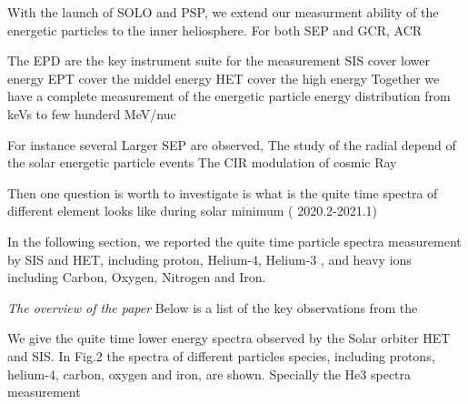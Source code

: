 
With the launch of \ac{SOLO} and \ac{PSP}, we extend our measurment ability of the energetic particles to the inner heliosphere. For both SEP and GCR, ACR

The EPD are the key instrument suite for the measurement
SIS cover lower energy 
EPT cover the middel energy 
HET cover the high energy 
Together we have a complete measurement of the energetic particle energy distribution from keVs to few hunderd MeV/nuc

For instance several Larger SEP are observed, 
The study of the radial depend of the solar energetic particle events
The CIR modulation of cosmic Ray

Then one question is worth to investigate is what is the quite time spectra of different element looks like during solar minimum ( 2020.2-2021.1)

In the following section, we reported the quite time particle spectra measurement by  SIS and HET, including proton, Helium-4, Helium-3 , and heavy ions including Carbon, Oxygen, Nitrogen and Iron.

\textit{The overview of the paper}
Below is a list of the key observations from the \citep{Mason-2021-SolOQuietTime}

We give the quite time lower energy spectra observed by the Solar orbiter HET and SIS. 
In Fig.2 the spectra of different particles species, including protons, helium-4, carbon, oxygen and iron, are shown.
Specially the He3 spectra measurement 


